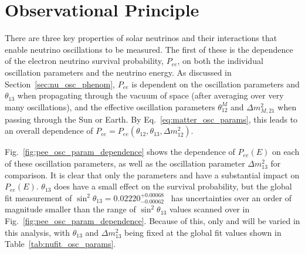\section{Observational Principle}\label{sec:solar_obs_principle}
There are three key properties of solar neutrinos and their interactions that enable neutrino oscillations to be measured. The first of these is the dependence of the electron neutrino survival probability, $P_{ee}$, on both the individual oscillation parameters and the neutrino energy. As discussed in Section~\ref{sec:nu_osc_phenom}, $P_{ee}$ is dependent on the oscillation parameters \tonetwo{} and $\theta_{13}$ when propagating through the vacuum of space (after averaging over very many oscillations), and the effective oscillation parameters $\theta_{12}^{M}$ and $\Delta m^{2}_{M,21}$ when passing through the Sun or Earth. By Eq.~\ref{eq:matter_osc_params}, this leads to an overall dependence of $P_{ee} = P_{ee}\left(\theta_{12}, \theta_{13}, \Delta m^{2}_{12}\right)$.

Fig.~\ref{fig:pee_osc_param_dependence} shows the dependence of $P_{ee}(E)$ on each of these oscillation parameters, as well as the oscillation parameter $\Delta m^{2}_{13}$ for comparison. It is clear that only the parameters \dmsq{} and \tonetwo{} have a substantial impact on $P_{ee}(E)$. $\theta_{13}$ does have a small effect on the survival probability, but the global fit measurement of $\sin^{2}\theta_{13} = 0.02220^{+0.00068}_{-0.00062}$~\cite{estebanFateHintsUpdated2020} has uncertainties over an order of magnitude smaller than the range of $\sin^{2}\theta_{13}$ values scanned over in Fig.~\ref{fig:pee_osc_param_dependence}. Because of this, only \dmsq{} and \tonetwo{} will be varied in this analysis, with $\theta_{13}$ and $\Delta m^{2}_{13}$ being fixed at the global fit values shown in Table~\ref{tab:nufit_osc_params}.


